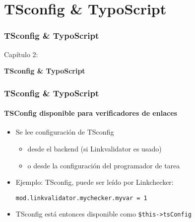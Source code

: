 %

\section{TSconfig \& TypoScript}
\begin{frame}[fragile]
	\frametitle{TSconfig \& TypoScript}

	\begin{center}\huge{Capítulo 2:}\end{center}
	\begin{center}\huge{\color{typo3darkgrey}\textbf{TSconfig \& TypoScript}}\end{center}

\end{frame}


\begin{frame}[fragile]
	\frametitle{TSconfig \& TypoScript}
	\framesubtitle{TSConfig disponible para verificadores de enlaces}

	\begin{itemize}
		\item Se lee configuración de TSconfig

			\begin{itemize}
				\item desde el backend (si Linkvalidator es usado)
				\item o desde la configuración del programador de tarea
			\end{itemize}

		\item Ejemplo: TSconfig, puede ser leído por Linkchecker:

			\lstinline!mod.linkvalidator.mychecker.myvar = 1!

		\item TSconfig está entonces disponible como \texttt{\$this->tsConfig}
	\end{itemize}

\end{frame}

